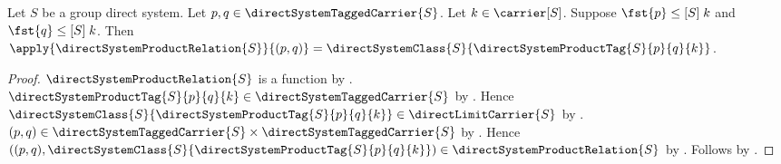\begin{proposition}\label{direct_system_product_relation_apply}
    Let $S$ be a group direct system.
    Let $p,q\in\directSystemTaggedCarrier{S}$.
    Let $k\in\carrier[S]$.
    Suppose $\fst{p}\mathrel{\leq[S]}k$ and
        $\fst{q}\mathrel{\leq[S]}k$.
    Then
        $\apply{\directSystemProductRelation{S}}{(p,q)}
        =\directSystemClass{S}{\directSystemProductTag{S}{p}{q}{k}}$.
\end{proposition}
\begin{proof}
    $\directSystemProductRelation{S}$ is a function by
        .
    $\directSystemProductTag{S}{p}{q}{k}\in
        \directSystemTaggedCarrier{S}$ by
        .
    Hence $\directSystemClass{S}{\directSystemProductTag{S}{p}{q}{k}}
        \in\directLimitCarrier{S}$ by
        .
    $(p,q)\in\directSystemTaggedCarrier{S}\times
        \directSystemTaggedCarrier{S}$ by
        .
    Hence
        $((p,q),\directSystemClass{S}
            {\directSystemProductTag{S}{p}{q}{k}})
        \in\directSystemProductRelation{S}$ by
        .
    Follows by .
\end{proof}

